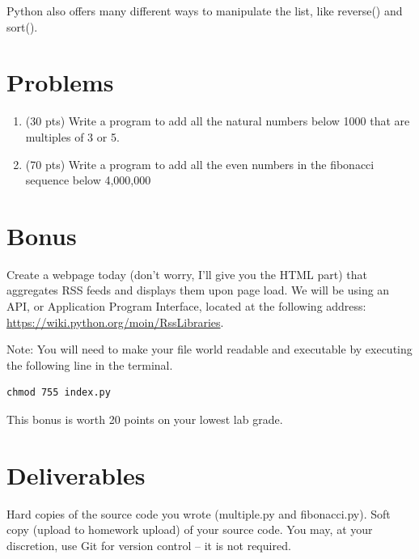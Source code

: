 \documentclass[letterpaper,12pt]{article}
\begin{document}
Python also offers many different ways to manipulate the list, like reverse() and sort().

\section*{Problems}
\begin{enumerate}
    \item (30 pts) Write a program to add all the natural numbers below 1000 that are multiples of 3 or 5.
    \item (70 pts) Write a program to add all the even numbers in the fibonacci sequence below 4,000,000
\end{enumerate}

\section*{Bonus}
Create a webpage today (don't worry, I'll give you the HTML part)
that aggregates RSS feeds and displays them upon page load. We will be using an API, or Application
Program Interface, located at the following address: \url{https://wiki.python.org/moin/RssLibraries}.

Note: You will need to make your file world readable and executable by executing the following line in the terminal.
\begin{lstlisting}
chmod 755 index.py
\end{lstlisting}

This bonus is worth 20 points on your lowest lab grade.

\section*{Deliverables}
Hard copies of the source code you wrote (multiple.py and fibonacci.py). Soft copy (upload to homework upload) of
your source code. You may, at your discretion, use Git for version control -- it is not required.
\end{document}
